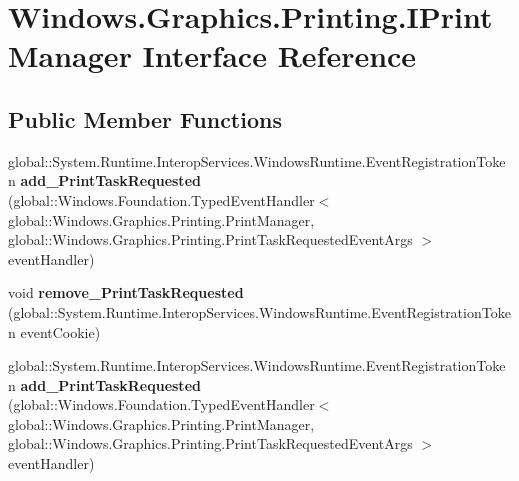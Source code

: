\hypertarget{interface_windows_1_1_graphics_1_1_printing_1_1_i_print_manager}{}\section{Windows.\+Graphics.\+Printing.\+I\+Print\+Manager Interface Reference}
\label{interface_windows_1_1_graphics_1_1_printing_1_1_i_print_manager}
\subsection*{Public Member Functions}
\begin{DoxyCompactItemize}
\item 
\mbox{\label{interface_windows_1_1_graphics_1_1_printing_1_1_i_print_manager_a3847e13f6319e169ee1b0cad46349d55}} 
global\+::\+System.\+Runtime.\+Interop\+Services.\+Windows\+Runtime.\+Event\+Registration\+Token {\bfseries add\+\_\+\+Print\+Task\+Requested} (global\+::\+Windows.\+Foundation.\+Typed\+Event\+Handler$<$ global\+::\+Windows.\+Graphics.\+Printing.\+Print\+Manager, global\+::\+Windows.\+Graphics.\+Printing.\+Print\+Task\+Requested\+Event\+Args $>$ event\+Handler)
\item 
\mbox{\label{interface_windows_1_1_graphics_1_1_printing_1_1_i_print_manager_a9fc2ea04a3aea1a103a829815f1cbc9d}} 
void {\bfseries remove\+\_\+\+Print\+Task\+Requested} (global\+::\+System.\+Runtime.\+Interop\+Services.\+Windows\+Runtime.\+Event\+Registration\+Token event\+Cookie)
\item 
\mbox{\label{interface_windows_1_1_graphics_1_1_printing_1_1_i_print_manager_a3847e13f6319e169ee1b0cad46349d55}} 
global\+::\+System.\+Runtime.\+Interop\+Services.\+Windows\+Runtime.\+Event\+Registration\+Token {\bfseries add\+\_\+\+Print\+Task\+Requested} (global\+::\+Windows.\+Foundation.\+Typed\+Event\+Handler$<$ global\+::\+Windows.\+Graphics.\+Printing.\+Print\+Manager, global\+::\+Windows.\+Graphics.\+Printing.\+Print\+Task\+Requested\+Event\+Args $>$ event\+Handler)
\item 
\mbox{\label{interface_windows_1_1_graphics_1_1_printing_1_1_i_print_manager_a9fc2ea04a3aea1a103a829815f1cbc9d}} 

\end{DoxyCompactItemize}
